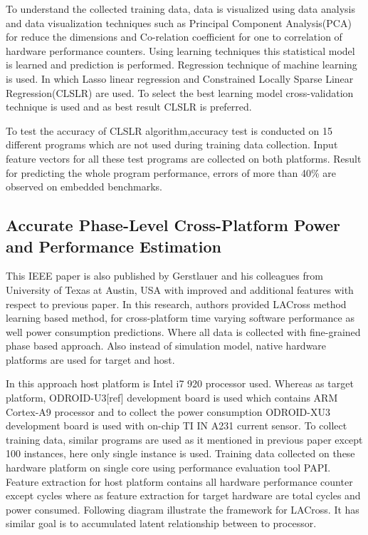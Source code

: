 \par To understand the collected training data, data is visualized using data analysis and data visualization techniques such as Principal Component Analysis(PCA) for reduce the dimensions and Co-relation coefficient for one to correlation of hardware performance counters. Using learning techniques this statistical model is learned and prediction is performed. Regression technique of machine learning is used. In which Lasso linear regression and Constrained Locally Sparse Linear Regression(CLSLR) are used. To select the best learning model cross-validation technique is used and as best result CLSLR is preferred. 

\par To test the accuracy of CLSLR algorithm,accuracy test is conducted on 15 different programs which are not used during training data collection. Input feature vectors for all these test programs are collected on both platforms. Result for predicting the whole program performance, errors of more than 40\% are observed on embedded benchmarks. 

\subsection{Accurate Phase-Level Cross-Platform Power and Performance Estimation}
This IEEE paper is also published by Gerstlauer and his colleagues from University of Texas at Austin, USA with improved and additional features with respect to previous paper. In this research, authors provided LACross method learning based method, for cross-platform time varying software performance as well power consumption predictions. Where all data is collected with fine-grained phase based approach. Also instead of simulation model, native hardware platforms are used for target and host.

\par In this approach host platform is Intel i7 920 processor used. Whereas as target platform, ODROID-U3[ref] development board is used which contains ARM Cortex-A9 processor and to collect the power consumption ODROID-XU3 development board is used with on-chip TI IN A231 current sensor. To collect training data, similar programs are used as it mentioned in previous paper except 100 instances, here only single instance is used. Training data collected on these hardware platform on single core using performance evaluation tool PAPI. Feature extraction for host platform contains all hardware performance counter except cycles where as feature extraction for target hardware are total cycles and power consumed. Following diagram illustrate the framework for LACross. It has similar goal is to accumulated latent relationship between to processor.

